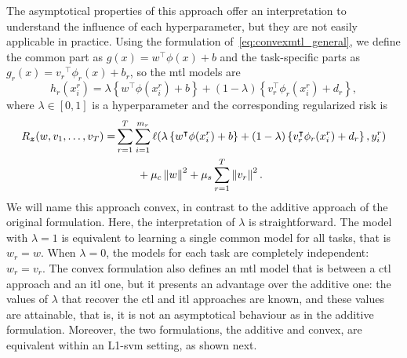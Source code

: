 The asymptotical properties of this approach offer an interpretation to understand the influence of each hyperparameter, but they are not easily applicable in practice.
Using the formulation of~\eqref{eq:convexmtl_general}, we define the common part as $g(x) =  {w}^\intercal {\phi(x)} + b$ and the task-specific parts as $g_r(x) = {v_r}^\intercal {\phi_r(x)} + b_r$, so the \acrshort{mtl} models are
\begin{equation}
    \label{eq:convexmtl_modeldef}
    h_r(x_i^r) = \lambda \left\lbrace {w}^\intercal {\phi(x_i^r)} + b \right\rbrace + (1 - \lambda) \left\lbrace {v}_r^\intercal {\phi_r(x_i^r)} + d_r \right\rbrace ,
\end{equation}
where $\lambda \in \left[0, 1\right]$ is a hyperparameter and the corresponding regularized risk is 
\begin{equation}
    \nonumber
    \begin{aligned}
        R_{\bm{z}} ({w, v_1, \ldots, v_T}) = &\sum_{r=1}^{T} \sum_{i=1}^{m_r} \ell(\lambda \left\lbrace {w}^\intercal {\phi(x_i^r)} + b \right\rbrace + (1 - \lambda) \left\lbrace {v}_r^\intercal {\phi_r(x_i^r)} + d_r \right\rbrace, y_i^r) \\ 
        &\qquad + \mu_c \left\lVert{w}\right\rVert^2 + \mu_s \sum_{r=1}^T \left\lVert{v}_r\right\rVert^2 .
    \end{aligned}
\end{equation}
We will name this approach {convex}, in contrast to the {additive} approach of the original formulation.
Here, the interpretation of $\lambda$ is straightforward. The model with $\lambda = 1$ is equivalent to learning a single common model for all tasks, that is ${w}_r = {w}$. When $\lambda=0$, the models for each task are completely independent: ${w}_r = {v}_r$.
The convex formulation also defines an \acrshort{mtl} model that is between a \acrshort{ctl} approach and an \acrshort{itl} one, but it presents an advantage over the additive one: the values of $\lambda$ that recover the \acrshort{ctl} and \acrshort{itl} approaches are known, and these values are attainable, that is, it is not an asymptotical behaviour as in the additive formulation. 
%
Moreover, the two formulations, the {additive} and {convex}, are equivalent within an L1-\acrshort{svm} setting, as shown next.
%




